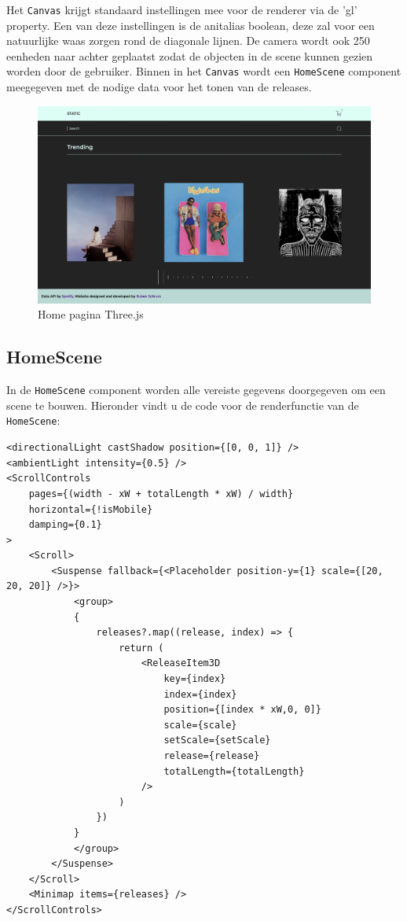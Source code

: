 Het \texttt{Canvas} krijgt standaard instellingen mee voor de renderer via de 'gl' property. Een van deze instellingen is de anitalias boolean, deze zal voor een natuurlijke waas zorgen rond de diagonale lijnen. De camera wordt ook 250 eenheden naar achter geplaatst zodat de objecten in de scene kunnen gezien worden door de gebruiker. Binnen in het \texttt{Canvas} wordt een \texttt{HomeScene} component meegegeven met de nodige data voor het tonen van de releases.

\begin{figure}[h]
	\centering
	\includegraphics[width=1\linewidth]{graphics/desktopHomeThree}
	\caption[Home pagina Three.js]{Home pagina Three.js}
	\label{fig:desktopHomeThree}
\end{figure}

\newpage
\subsection{HomeScene}

In de \texttt{HomeScene} component worden alle vereiste gegevens doorgegeven om een scene te bouwen. Hieronder vindt u de code voor de renderfunctie van de \texttt{HomeScene}:

\begin{lstlisting}
<directionalLight castShadow position={[0, 0, 1]} />
<ambientLight intensity={0.5} />
<ScrollControls
	pages={(width - xW + totalLength * xW) / width}
	horizontal={!isMobile}
	damping={0.1}
>
	<Scroll>
		<Suspense fallback={<Placeholder position-y={1} scale={[20, 20, 20]} />}>
			<group>
			{
				releases?.map((release, index) => {
					return (
						<ReleaseItem3D
							key={index}
							index={index}
							position={[index * xW,0, 0]}
							scale={scale}
							setScale={setScale}
							release={release}
							totalLength={totalLength}
						/>
					)
				})
			}
			</group>
		</Suspense>
	</Scroll>
	<Minimap items={releases} />
</ScrollControls>
\end{lstlisting}

